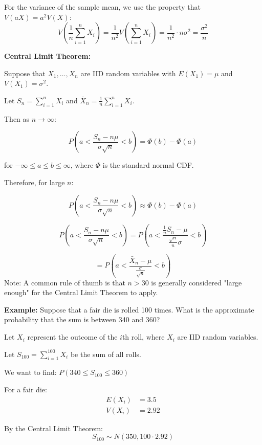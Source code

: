 \documentclass{article}
\begin{document}
    For the variance of the sample mean, we use the property that $V(aX) = a^2V(X)$:
    \[
    V\left(\frac{1}{n}\sum_{i=1}^n X_i\right) = \frac{1}{n^2}V\left(\sum_{i=1}^n X_i\right) = \frac{1}{n^2} \cdot n\sigma^2 = \frac{\sigma^2}{n}
    \]

    \noindent
    \textbf{Central Limit Theorem:}
    
    Suppose that $X_1, \ldots, X_n$ are IID random variables with $E(X_1) = \mu$ and $V(X_1) = \sigma^2$.
    
    Let $S_n = \sum_{i=1}^n X_i$ and $\bar{X}_n = \frac{1}{n}\sum_{i=1}^n X_i$.
    
    Then as $n \to \infty$:
    
    \[
    P\left(a < \frac{S_n - n\mu}{\sigma\sqrt{n}} < b\right) = \Phi(b) - \Phi(a)
    \]
    
    for $-\infty \leq a \leq b \leq \infty$, where $\Phi$ is the standard normal CDF.
    
    Therefore, for large $n$:
    
    \[
    P\left(a < \frac{S_n - n\mu}{\sigma\sqrt{n}} < b\right) \approx \Phi(b) - \Phi(a)
    \]

    \[
        P\left(a < \frac{S_n - n\mu}{\sigma\sqrt{n}} < b\right) = P\left(a < \frac{\frac{1}{n}S_n - \mu}{\frac{\sqrt{n}}{n} \sigma} < b\right)
    \]

    \[
    = P\left(a < \frac{\bar{X}_n - \mu}{\frac{\sigma}{\sqrt{n}}} < b\right)
    \]
    \noindent
    Note: A common rule of thumb is that $n > 30$ is generally considered "large enough" for the Central Limit Theorem to apply.

    \vspace{1em}
    \noindent
    \textbf{Example:} Suppose that a fair die is rolled 100 times. What is the approximate probability that the sum is between 340 and 360?

    Let $X_i$ represent the outcome of the $i$th roll, where $X_i$ are IID random variables.

    Let $S_{100} = \sum_{i=1}^{100} X_i$ be the sum of all rolls.

    We want to find: $P(340 \leq S_{100} \leq 360)$

    For a fair die:
    \begin{align*}
        E(X_i) &= 3.5 \\
        V(X_i) &= 2.92
    \end{align*}

    By the Central Limit Theorem:
    \[S_{100} \sim N(350, 100 \cdot 2.92)\]
\end{document}
